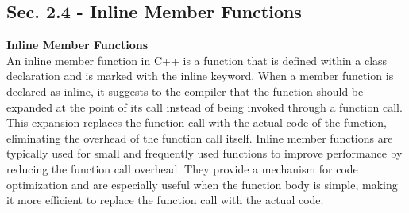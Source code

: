 \subsection{Sec. 2.4 - Inline Member Functions}
\noindent \textbf{Inline Member Functions} \\

An inline member function in C++ is a function that is defined within a class declaration and is marked with the inline keyword. When a member function is declared as inline, it suggests to the compiler that 
the function should be expanded at the point of its call instead of being invoked through a function call. This expansion replaces the function call with the actual code of the function, eliminating the overhead 
of the function call itself. Inline member functions are typically used for small and frequently used functions to improve performance by reducing the function call overhead. They provide a mechanism for code 
optimization and are especially useful when the function body is simple, making it more efficient to replace the function call with the actual code. \\

